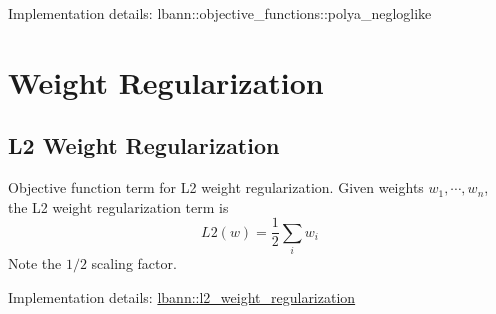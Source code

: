 Implementation details\+: lbann\+::objective\+\_\+functions\+::polya\+\_\+negloglike\hypertarget{obj_fn_weight_regularization}{}\section{Weight Regularization}\label{obj_fn_weight_regularization}
\hypertarget{obj_fn_l2_weight}{}\subsection{L2 Weight Regularization}\label{obj_fn_l2_weight}
Objective function term for L2 weight regularization. Given weights $w_1,\cdots,w_n$, the L2 weight regularization term is \[ L2(w) = \frac{1}{2} \sum\limits_{i} w_i \] Note the $1/2$ scaling factor.

Implementation details\+: \hyperlink{classlbann_1_1l2__weight__regularization}{lbann\+::l2\+\_\+weight\+\_\+regularization} 